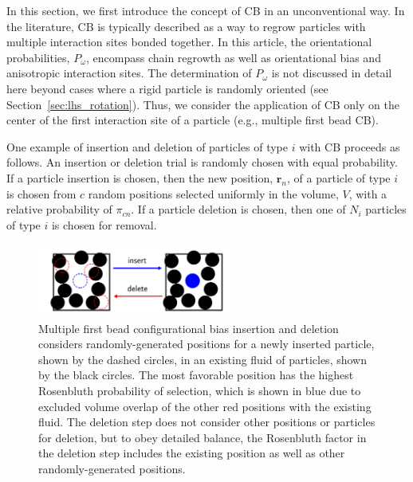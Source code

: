 \documentclass[
  9pt,
  bestpractices,
]{livecoms}
\begin{document}
In this section, we first introduce the concept of CB \cite{rosenbluth_monte_1955, siepmann_configurational_1992, mooij_direct_1992, de_pablo_estimation_1992} in an unconventional way.
In the literature, CB is typically described as a way to regrow particles with multiple interaction sites bonded together.
In this article, the orientational probabilities, $P_{\omega}$, encompass chain regrowth as well as orientational bias and anisotropic interaction sites.
The determination of $P_{\omega}$ is not discussed in detail here beyond cases where a rigid particle is randomly oriented (see Section~\ref{sec:lhs_rotation}).
Thus, we consider the application of CB only on the center of the first interaction site of a particle (e.g., multiple first bead CB).

One example of insertion and deletion of particles of type $i$ with CB proceeds as follows.
An insertion or deletion trial is randomly chosen with equal probability.
If a particle insertion is chosen, then the new position, $\mathbf{r}_n$, of a particle of type $i$ is chosen from ${c}$ random positions selected uniformly in the volume, $V$, with a relative probability of $\pi_{cn}$.
If a particle deletion is chosen, then one of $N_i$ particles of type $i$ is chosen for removal.

\begin{figure}
\begin{centering}
\includegraphics[width=6.5cm]{../figures/muvt_cb.png}
\caption{
Multiple first bead configurational bias insertion and deletion considers randomly-generated positions for a newly inserted particle, shown by the dashed circles, in an existing fluid of particles, shown by the black circles.
The most favorable position has the highest Rosenbluth probability of selection, which is shown in blue due to excluded volume overlap of the other red positions with the existing fluid.
The deletion step does not consider other positions or particles for deletion, but to obey detailed balance, the Rosenbluth factor in the deletion step includes the existing position as well as other randomly-generated positions.
}
\label{fig:muvt_cb}
\end{centering}
\end{figure}
\end{document}
